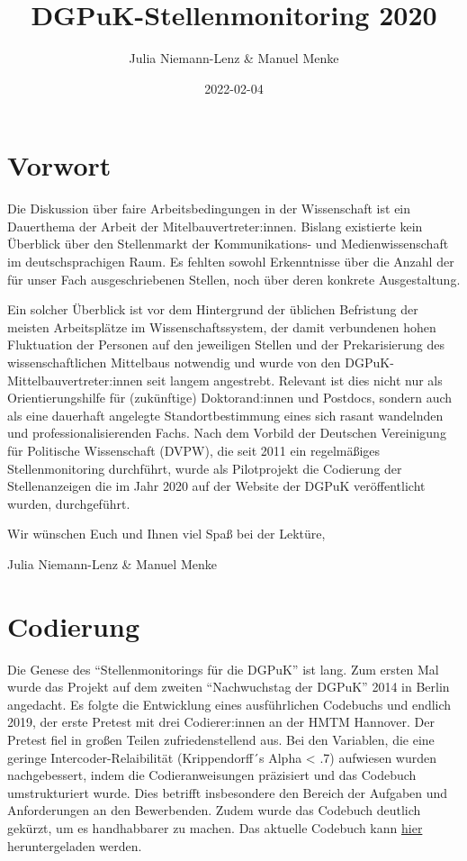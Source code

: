 \documentclass[
]{article}
\title{DGPuK-Stellenmonitoring 2020}
\author{Julia Niemann-Lenz \& Manuel Menke}
\date{2022-02-04}
\begin{document}
\maketitle

{
\setcounter{tocdepth}{2}
\tableofcontents
}
\newpage

\hypertarget{vorwort}{%
\section*{Vorwort}\label{vorwort}}

Die Diskussion über faire Arbeitsbedingungen in der Wissenschaft ist ein Dauerthema der Arbeit der Mitelbauvertreter:innen. Bislang existierte kein Überblick über den Stellenmarkt der Kommunikations- und Medienwissenschaft im deutschsprachigen Raum. Es fehlten sowohl Erkenntnisse über die Anzahl der für unser Fach ausgeschriebenen Stellen, noch über deren konkrete Ausgestaltung.

Ein solcher Überblick ist vor dem Hintergrund der üblichen Befristung der meisten Arbeitsplätze im Wissenschaftssystem, der damit verbundenen hohen Fluktuation der Personen auf den jeweiligen Stellen und der Prekarisierung des wissenschaftlichen Mittelbaus notwendig und wurde von den DGPuK-Mittelbauvertreter:innen seit langem angestrebt. Relevant ist dies nicht nur als Orientierungshilfe für (zukünftige) Doktorand:innen und Postdocs, sondern auch als eine dauerhaft angelegte Standortbestimmung eines sich rasant wandelnden und professionalisierenden Fachs.
Nach dem Vorbild der Deutschen Vereinigung für Politische Wissenschaft (DVPW), die seit 2011 ein regelmäßiges Stellenmonitoring durchführt, wurde als Pilotprojekt die Codierung der Stellenanzeigen die im Jahr 2020 auf der Website der DGPuK veröffentlicht wurden, durchgeführt.

Wir wünschen Euch und Ihnen viel Spaß bei der Lektüre,

Julia Niemann-Lenz \& Manuel Menke

\newpage

\hypertarget{codierung}{%
\section{Codierung}\label{codierung}}

Die Genese des ``Stellenmonitorings für die DGPuK'' ist lang. Zum ersten Mal wurde das Projekt auf dem zweiten ``Nachwuchstag der DGPuK'' 2014 in Berlin angedacht. Es folgte die Entwicklung eines ausführlichen Codebuchs und endlich 2019, der erste Pretest mit drei Codierer:innen an der HMTM Hannover. Der Pretest fiel in großen Teilen zufriedenstellend aus. Bei den Variablen, die eine geringe Intercoder-Relaibilität (Krippendorff´s Alpha \textless{} .7) aufwiesen wurden nachgebessert, indem die Codieranweisungen präzisiert und das Codebuch umstrukturiert wurde. Dies betrifft insbesondere den Bereich der Aufgaben und Anforderungen an den Bewerbenden. Zudem wurde das Codebuch deutlich gekürzt, um es handhabbarer zu machen. Das aktuelle Codebuch kann \href{data/Konzept_Stellenmonitoring_2021-08-05.pdf}{hier} heruntergeladen werden.
\end{document}
